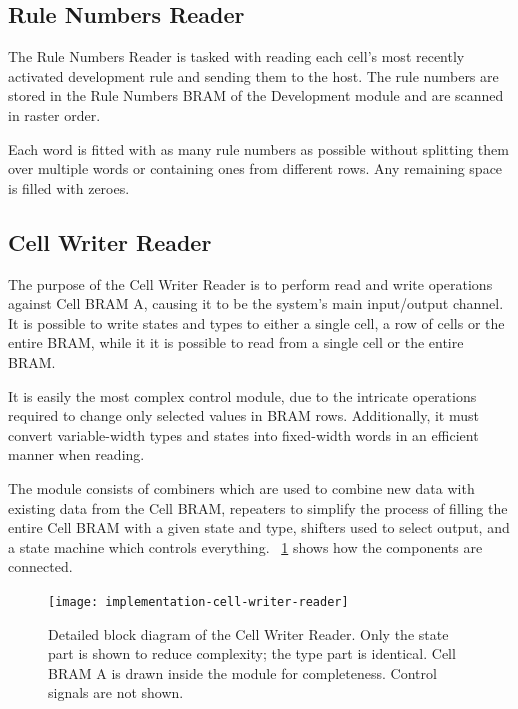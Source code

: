 \subsection{Rule Numbers Reader}
\label{sec:rule-numbers-reader}

The Rule Numbers Reader is tasked with reading each cell's most recently activated development rule and sending them to the host.
The rule numbers are stored in the Rule Numbers BRAM of the Development module and are scanned in raster order\footnotemark.

Each word is fitted with as many rule numbers as possible without splitting them over multiple words or containing ones from different rows.
Any remaining space is filled with zeroes.

\subsection{Cell Writer Reader}

The purpose of the Cell Writer Reader is to perform read and write operations against Cell BRAM A, causing it to be the system's main input/output channel.
It is possible to write states and types to either a single cell, a row of cells or the entire BRAM, while it it is possible to read from a single cell or the entire BRAM.

It is easily the most complex control module, due to the intricate operations required to change only selected values in BRAM rows.
Additionally, it must convert variable-width types and states into fixed-width words in an efficient manner when reading.

The module consists of combiners which are used to combine new data with existing data from the Cell BRAM, repeaters to simplify the process of filling the entire Cell BRAM with a given state and type, shifters used to select output, and a state machine which controls everything.
\figurename~\ref{fig:implementation-cell-writer-reader} shows how the components are connected.

\begin{figure}[!ht]
    \centering
    \texttt{[image: implementation-cell-writer-reader]}
    \caption[Cell Writer Reader]{
        Detailed block diagram of the Cell Writer Reader.
        Only the state part is shown to reduce complexity; the type part is identical.
        Cell BRAM A is drawn inside the module for completeness.
        Control signals are not shown.
    }
    \label{fig:implementation-cell-writer-reader}
\end{figure}

